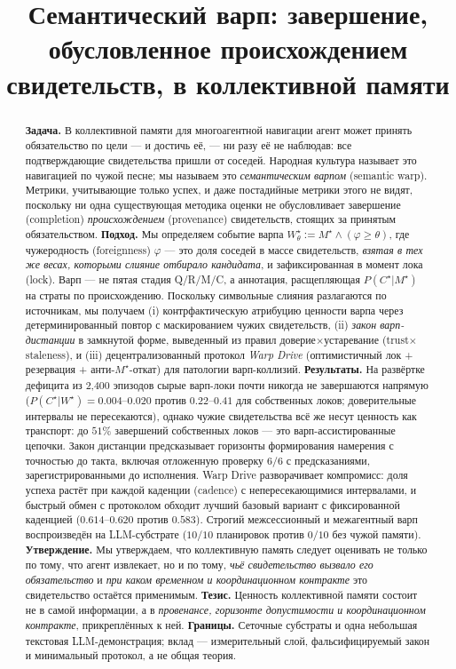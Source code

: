 \documentclass{article}
\title{Семантический варп: завершение, обусловленное происхождением\\свидетельств, в коллективной памяти}
\newcommand{\wstar}{W^{\star}}
\newcommand{\mstar}{M^{\star}}
\newcommand{\cstar}{C^{\star}}
\begin{document}
\maketitle

\begin{abstract}
\textbf{Задача.} В коллективной памяти для многоагентной навигации агент может принять обязательство по цели --- и достичь её, --- ни разу её не наблюдав: все подтверждающие свидетельства пришли от соседей. Народная культура называет это навигацией по чужой песне; мы называем это \emph{семантическим варпом} (semantic warp). Метрики, учитывающие только успех, и даже постадийные метрики этого не видят, поскольку ни одна существующая методика оценки не обусловливает завершение (completion) \emph{происхождением} (provenance) свидетельств, стоящих за принятым обязательством.
\textbf{Подход.} Мы определяем событие варпа $\wstar_\theta := \mstar \wedge (\varphi \ge \theta)$, где чужеродность (foreignness) $\varphi$ --- это доля соседей в массе свидетельств, \emph{взятая в тех же весах, которыми слияние отбирало кандидата}, и зафиксированная в момент лока (lock). Варп --- не пятая стадия Q/R/M/C, а аннотация, расщепляющая $P(\cstar|\mstar)$ на страты по происхождению. Поскольку символьные слияния разлагаются по источникам, мы получаем (i) контрфактическую атрибуцию ценности варпа через детерминированный повтор с маскированием чужих свидетельств, (ii) \emph{закон варп-дистанции} в замкнутой форме, выведенный из правил доверие$\times$устаревание (trust$\times$staleness), и (iii) децентрализованный протокол \emph{Warp Drive} (оптимистичный лок + резервация + анти-$\mstar$-откат) для патологии варп-коллизий.
\textbf{Результаты.} На развёртке дефицита из 2{,}400 эпизодов сырые варп-локи почти никогда не завершаются напрямую ($P(\cstar|\wstar)=0.004$--$0.020$ против $0.22$--$0.41$ для собственных локов; доверительные интервалы не пересекаются), однако чужие свидетельства всё же несут ценность как транспорт: до $51\%$ завершений собственных локов --- это варп-ассистированные цепочки. Закон дистанции предсказывает горизонты формирования намерения с точностью до такта, включая отложенную проверку $6/6$ с предсказаниями, зарегистрированными до исполнения. Warp Drive разворачивает компромисс: доля успеха растёт при каждой каденции (cadence) с непересекающимися интервалами, и быстрый обмен с протоколом обходит лучший базовый вариант с фиксированной каденцией ($0.614$--$0.620$ против $0.583$). Строгий межсессионный и межагентный варп воспроизведён на LLM-субстрате ($10/10$ планировок против $0/10$ без чужой памяти).
\textbf{Утверждение.} Мы утверждаем, что коллективную память следует оценивать не только по тому, что агент извлекает, но и по тому, \emph{чьё свидетельство вызвало его обязательство} и \emph{при каком временном и координационном контракте} это свидетельство остаётся применимым.
\textbf{Тезис.} Ценность коллективной памяти состоит не в самой информации, а в \emph{провенансе, горизонте допустимости и координационном контракте}, прикреплённых к ней.
\textbf{Границы.} Сеточные субстраты и одна небольшая текстовая LLM-демонстрация; вклад --- измерительный слой, фальсифицируемый закон и минимальный протокол, а не общая теория.
\end{abstract}
\end{document}
